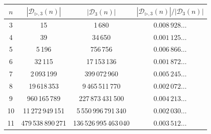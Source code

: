 \documentclass[reqno,a4paper,11pt]{amsart}
\newcommand{\btt}{\triangleright}
\theoremstyle{remark}
\newcommand{\mc}[1]{{\mathcal #1}}
\numberwithin{equation}{section}
\begin{document}
            \begin{table}[ht]
                \centering
                \vspace{0.5cm}
                \begin{tabular}{|c|c|c|c|}
                    \hline
                    $n$ & \multicolumn{1}{c|}{$|\mc D_{\btt, 3}(n)|$} & \multicolumn{1}{c|}{$|\mc D_3(n)|$} & \multicolumn{1}{c|}{\textit{$|\mc D_{\btt, 3}(n)|/|\mc D_3(n)|$}} \\ \hline
                    3                   & 15                     & 1\,680                             & $0.008\,928\ldots$              \\ \hline
                    4                   & 39                     & 34\,650                            & $0.001\,125\ldots$              \\ \hline
                    5                   & 5\,196                  & 756\,756                           & $0.006\,866\ldots$              \\ \hline
                    6                   & 32\,115                  & 17\,153\,136                         & $0.001\,872\ldots$             \\ \hline
                    7                   & 2\,093\,199                & 399\,072\,960                        & $0.005\,245\ldots$             \\ \hline
                    8                   & 19\,618\,353               & 9\,465\,511\,770                       & $0.002\,072\ldots$             \\ \hline
                    9                   & 960\,165\,789             & 227\,873\,431\,500                     & $0.004\,213\ldots$              \\ \hline
                    10                  & 11\,272\,949\,151            & 5\,550\,996\,791\,340                    & $0.002\,030\ldots$              \\ \hline
                    11                  & 479\,538\,890\,271            & 136\,526\,995\,463\,040                    & $0.003\,512\ldots$             

\end{tabular}
\end{table}
\end{document}
